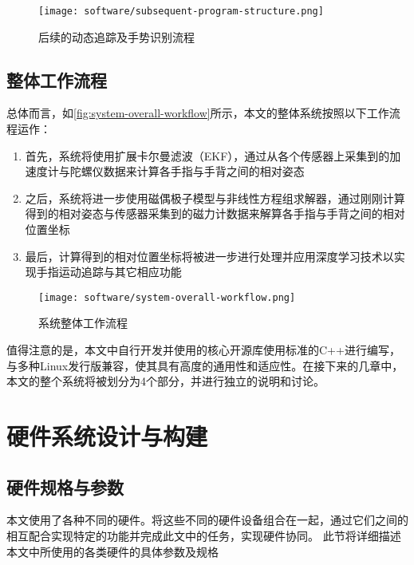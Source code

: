 \begin{figure}[H]
    \centering
    \texttt{[image: software/subsequent-program-structure.png]}
    \caption{\label{fig:subsequent-program-structure}后续的动态追踪及手势识别流程}
\end{figure}

\subsection{整体工作流程}
总体而言，如\autoref{fig:system-overall-workflow}所示，本文的整体系统按照以下工作流程运作：
\begin{enumerate}[label=(\alph*)]
    \item 首先，系统将使用扩展卡尔曼滤波（EKF），通过从各个传感器上采集到的加速度计与陀螺仪数据来计算各手指与手背之间的相对姿态
    \item 之后，系统将进一步使用磁偶极子模型与非线性方程组求解器，通过刚刚计算得到的相对姿态与传感器采集到的磁力计数据来解算各手指与手背之间的相对位置坐标
    \item 最后，计算得到的相对位置坐标将被进一步进行处理并应用深度学习技术以实现手指运动追踪与其它相应功能
\end{enumerate}

\begin{figure}[H]
    \centering
    \texttt{[image: software/system-overall-workflow.png]}
    \caption{\label{fig:system-overall-workflow}系统整体工作流程}
\end{figure}

值得注意的是，本文中自行开发并使用的核心开源库使用标准的C++进行编写，与多种Linux发行版兼容，使其具有高度的通用性和适应性。在接下来的几章中，本文的整个系统将被划分为4个部分，并进行独立的说明和讨论。

\cleardoublepage
\section{硬件系统设计与构建}
\subsection{硬件规格与参数}
本文使用了各种不同的硬件。将这些不同的硬件设备组合在一起，通过它们之间的相互配合实现特定的功能并完成此文中的任务，实现硬件协同。
此节将详细描述本文中所使用的各类硬件的具体参数及规格
